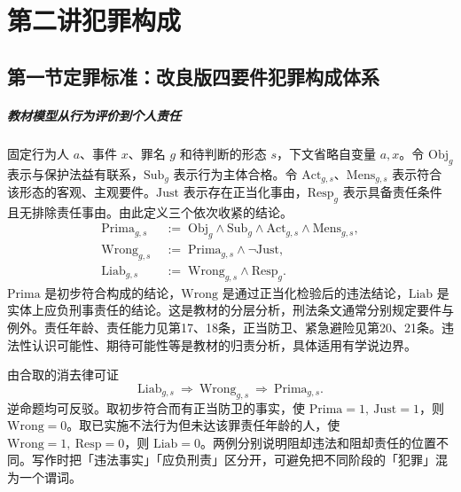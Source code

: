 \chapter{第二讲\quad 犯罪构成}
\label{lecture:02}
\par

\section{第一节\quad 定罪标准：改良版四要件犯罪构成体系}

\paragraph{教材模型\quad 从行为评价到个人责任}
固定行为人 \(a\)、事件 \(x\)、罪名 \(g\) 和待判断的形态 \(s\)，下文省略自变量 \(a,x\)。令 \(\mathrm{Obj}_g\) 表示与保护法益有联系，\(\mathrm{Sub}_g\) 表示行为主体合格。令 \(\mathrm{Act}_{g,s}\)、\(\mathrm{Mens}_{g,s}\) 表示符合该形态的客观、主观要件。\(\mathrm{Just}\) 表示存在正当化事由，\(\mathrm{Resp}_g\) 表示具备责任条件且无排除责任事由。由此定义三个依次收紧的结论。
\begin{align*}
 \mathrm{Prima}_{g,s}
   &\;:=\;\mathrm{Obj}_g\land\mathrm{Sub}_g
                \land\mathrm{Act}_{g,s}\land\mathrm{Mens}_{g,s},\\
 \mathrm{Wrong}_{g,s}
   &\;:=\;\mathrm{Prima}_{g,s}\land\neg\mathrm{Just},\\
 \mathrm{Liab}_{g,s}
   &\;:=\;\mathrm{Wrong}_{g,s}\land\mathrm{Resp}_g .
\end{align*}
\(\mathrm{Prima}\) 是初步符合构成的结论，\(\mathrm{Wrong}\) 是通过正当化检验后的违法结论，\(\mathrm{Liab}\) 是实体上应负刑事责任的结论。这是教材的分层分析，刑法条文通常分别规定要件与例外。责任年龄、责任能力见第17、18条，正当防卫、紧急避险见第20、21条。违法性认识可能性、期待可能性等是教材的归责分析，具体适用有学说边界。

由合取的消去律可证
\[
 \mathrm{Liab}_{g,s}\ \Rightarrow\
 \mathrm{Wrong}_{g,s}\ \Rightarrow\ \mathrm{Prima}_{g,s}.
\]
逆命题均可反驳。取初步符合而有正当防卫的事实，使 \(\mathrm{Prima}=1,\ \mathrm{Just}=1\)，则 \(\mathrm{Wrong}=0\)。取已实施不法行为但未达该罪责任年龄的人，使 \(\mathrm{Wrong}=1,\ \mathrm{Resp}=0\)，则 \(\mathrm{Liab}=0\)。两例分别说明阻却违法和阻却责任的位置不同。写作时把「违法事实」「应负刑责」区分开，可避免把不同阶段的「犯罪」混为一个谓词。

